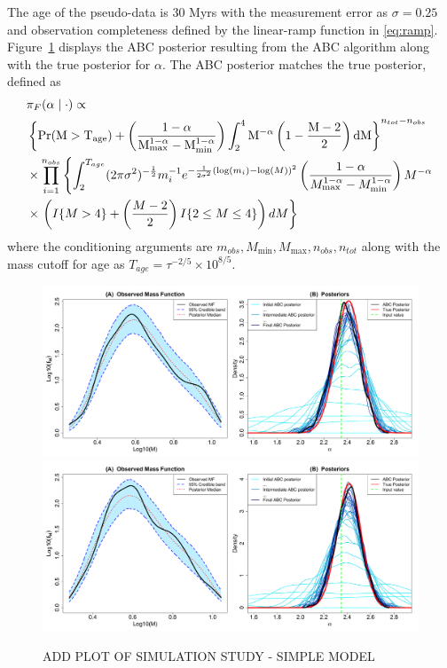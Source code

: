 \documentclass[12pt]{article}
\newcommand{\Proba}{\rm{Pr}}
\begin{document}
The age of the pseudo-data is 30 Myrs with the measurement error as $\sigma = 0.25$ and observation completeness defined by the linear-ramp function in \eqref{eq:ramp}.  Figure~\ref{fig:abc_simple} displays  the ABC posterior resulting from the ABC algorithm along with the true posterior for $\alpha$.  The ABC posterior matches the true posterior, defined as 
\begin{align}
&\pi_F(\alpha \mid \cdot) \propto \\  &\left \{\Proba(M>T_{age})+\left(\frac{1-\alpha}{M_{\max}^{1-\alpha}-M_{\min}^{1-\alpha}}\right)\int_2^4 M^{-\alpha}\left(1-\frac{M-2}{2}\right )dM\right \}^{n_{tot}-n_{obs}}  \nonumber \\ \nonumber
& \times \prod_{i=1}^{n_{obs}}\left\{ \int_2^{T_{age}}(2\pi\sigma^2)^{-\frac{1}{2}}m_i^{-1}e^{-\frac{1}{2\sigma^2}(\log(m_i)-\log(M))^2} \left(\frac{1-\alpha}{M_{\max}^{1-\alpha}-M_{\min}^{1-\alpha}}\right)M^{-\alpha} \right.\\ \nonumber
& \times  \left.\left(I\{M>4\}+\left(\frac{M-2}{2}\right)I\{2\leq M\leq 4\}\right) dM \right\}
\end{align}
where the conditioning arguments are $ m_{obs}, M_{\min}, M_{\max}, n_{obs}, n_{tot}$ along with the mass cutoff for age as $T_{age} = \tau^{-2/5} \times 10^{8/5}$.


\begin{figure}[htbp]
   \centering
\includegraphics[width = .85\textwidth]{figures/ind01.pdf}  \\
\includegraphics[width = .85\textwidth]{figures/ind03.pdf} 
   \caption{ADD PLOT OF SIMULATION STUDY - SIMPLE MODEL}
   \label{fig:abc_simple}
\end{figure}
\end{document}
